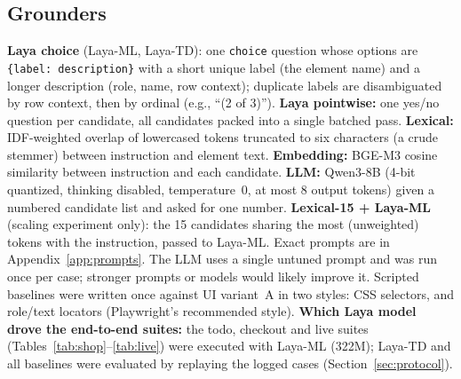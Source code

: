 \documentclass[11pt,a4paper]{article}
\begin{document}
\subsection{Grounders}
\textbf{Laya choice} (Laya-ML, Laya-TD): one \texttt{choice} question whose options are \texttt{\{label: description\}} with a short unique label (the element name) and a longer description (role, name, row context); duplicate labels are disambiguated by row context, then by ordinal (e.g., ``(2 of 3)''). \textbf{Laya pointwise:} one yes/no question per candidate, all candidates packed into a single batched pass. \textbf{Lexical:} IDF-weighted overlap of lowercased tokens truncated to six characters (a crude stemmer) between instruction and element text. \textbf{Embedding:} BGE-M3 cosine similarity between instruction and each candidate. \textbf{LLM:} Qwen3-8B (4-bit quantized, thinking disabled, temperature~0, at most 8 output tokens) given a numbered candidate list and asked for one number. \textbf{Lexical-15 + Laya-ML} (scaling experiment only): the 15 candidates sharing the most (unweighted) tokens with the instruction, passed to Laya-ML. Exact prompts are in Appendix~\ref{app:prompts}. The LLM uses a single untuned prompt and was run once per case; stronger prompts or models would likely improve it. Scripted baselines were written once against UI variant~A in two styles: CSS selectors, and role/text locators (Playwright's recommended style). \textbf{Which Laya model drove the end-to-end suites:} the todo, checkout and live suites (Tables~\ref{tab:shop}--\ref{tab:live}) were executed with Laya-ML (322M); Laya-TD and all baselines were evaluated by replaying the logged cases (Section~\ref{sec:protocol}).
\end{document}
